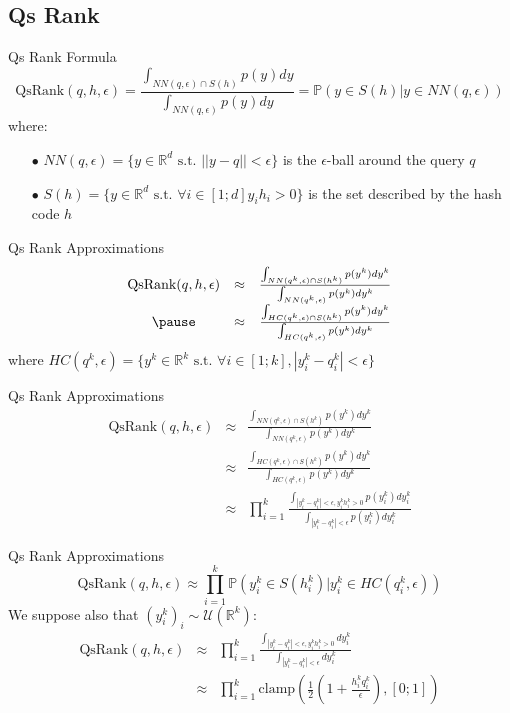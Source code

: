 \documentclass[english]{beamer}
\newcommand{\RR}{\mathbb{R}}
\newcommand{\qr}{\textrm{QsRank}}
\theoremstyle{plain}
\theoremstyle{remark}
\begin{document}
\subsection{Qs Rank}

\begin{frame}{Qs Rank Formula}
\[
	\qr(q, h, \epsilon) = \frac{\int_{NN(q,\epsilon) \cap S(h)} p(y) dy}{\int_{NN(q,\epsilon)} p(y) dy} = \mathbb{P}(y \in S(h) | y\in NN(q,\epsilon))
\]
where:
\begin{enumerate}
	\item[$\bullet$]$NN(q,\epsilon) = \{y \in \RR^d \text{ s.t. } ||y-q||<\epsilon\}$ is the $\epsilon$-ball around the query $q$
	\item[$\bullet$]$S(h) = \{y \in \RR^d \text{ s.t. } \forall i \in [1;d] y_i h_i > 0 \}$ is the set described by the hash code $h$
\end{enumerate}
\end{frame}

\begin{frame}{Qs Rank Approximations}
\[
	\begin{array}{ccc}
	\qr(q, h, \epsilon) 
	& \approx & \frac{\int_{NN(q^k,\epsilon) \cap S(h^k)} p(y^k) dy^k}{\int_{NN(q^k,\epsilon)} p(y^k) dy^k}\\
	\pause
	& \approx & \frac{\int_{HC(q^k,\epsilon) \cap S(h^k)} p(y^k) dy^k}{\int_{HC(q^k,\epsilon)} p(y^k) dy^k}
	\end{array}
\]
where $HC(q^k,\epsilon) = \{y^k \in \RR^k \text{ s.t. } \forall i \in [1;k], |y^k_i-q^k_i|<\epsilon\}$
\end{frame}

\begin{frame}{Qs Rank Approximations}
\[
	\begin{array}{ccc}
	\qr(q, h, \epsilon) 
	& \approx & \frac{\int_{NN(q^k,\epsilon) \cap S(h^k)} p(y^k) dy^k}{\int_{NN(q^k,\epsilon)} p(y^k) dy^k}\\
	& \approx & \frac{\int_{HC(q^k,\epsilon) \cap S(h^k)} p(y^k) dy^k}{\int_{HC(q^k,\epsilon)} p(y^k) dy^k}\\
	& \approx & \prod_{i=1}^k \frac{\int_{|y^k_i - q^k_i| < \epsilon, y^k_i h^k_i > 0 } p(y^k_i) dy^k_i}{\int_{|y^k_i - q^k_i| < \epsilon} p(y^k_i) dy^k_i}
	\end{array}
\]
\end{frame}

\begin{frame}{Qs Rank Approximations}
\[
	\qr(q, h, \epsilon) \approx \prod_{i=1}^k \mathbb{P}(y^k_i \in S(h^k_i) | y^k_i \in HC(q^k_i,\epsilon))
\]
We suppose also that $(y_i^k)_i \sim \mathcal{U}(\RR^k)$:
\[
	\begin{array}{ccc}
	\qr(q, h, \epsilon) 
	& \approx & \prod_{i=1}^k \frac{\int_{|y^k_i - q^k_i| < \epsilon, y^k_i h^k_i > 0 } dy^k_i}{\int_{|y^k_i - q^k_i| < \epsilon} dy^k_i} \\
	& \approx & \prod_{i=1}^k \text{clamp} (\frac{1}{2}( 1 + \frac{h^k_i q^k_i}{\epsilon} ), [0;1] )                  
	\end{array}
\]
\end{frame}
\end{document}
